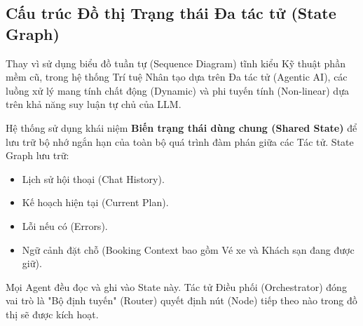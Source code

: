 \subsection{Cấu trúc Đồ thị Trạng thái Đa tác tử (State Graph)}
Thay vì sử dụng biểu đồ tuần tự (Sequence Diagram) tĩnh kiểu Kỹ thuật phần mềm cũ, trong hệ thống Trí tuệ Nhân tạo dựa trên Đa tác tử (Agentic AI), các luồng xử lý mang tính chất động (Dynamic) và phi tuyến tính (Non-linear) dựa trên khả năng suy luận tự chủ của LLM.

Hệ thống sử dụng khái niệm \textbf{Biến trạng thái dùng chung (Shared State)} để lưu trữ bộ nhớ ngắn hạn của toàn bộ quá trình đàm phán giữa các Tác tử. State Graph lưu trữ:
\begin{itemize}
    \item Lịch sử hội thoại (Chat History).
    \item Kế hoạch hiện tại (Current Plan).
    \item Lỗi nếu có (Errors).
    \item Ngữ cảnh đặt chỗ (Booking Context bao gồm Vé xe và Khách sạn đang được giữ).
\end{itemize}

Mọi Agent đều đọc và ghi vào State này. Tác tử Điều phối (Orchestrator) đóng vai trò là "Bộ định tuyến" (Router) quyết định nút (Node) tiếp theo nào trong đồ thị sẽ được kích hoạt.
